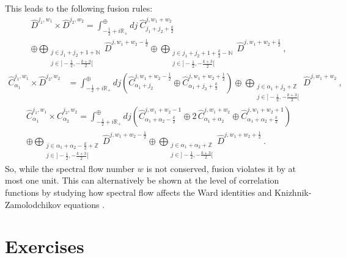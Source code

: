 \documentclass[12pt, a4paper, notitlepage, twoside]{report}
\numberwithin{equation}{section}
\theoremstyle{break}
\begin{document}
This leads to the following fusion rules:
\begin{multline}
\hat{D}^{j_1,w_1}\times \hat{D}^{j_2,w_2} = \int^\oplus_{-\frac12+i{\mathbb{R}}_+} dj\ \hat{C}^{j,w_1+w_2}_{j_1+j_2+\frac{k}{2}} 
\\ \oplus 
\bigoplus_{\substack{j\in j_1+j_2+1+{\mathbb{N}} \\ j\in ]-\frac12, -\frac{k+3}{2}[}} \hat{D}^{j,w_1+w_2-\frac12} \oplus 
\bigoplus_{\substack{j\in j_1+j_2+1+\frac{k}{2}-{\mathbb{N}} \\ j\in ]-\frac12, -\frac{k+3}{2}[}} \hat{D}^{j,w_1+w_2+\frac12}\ ,
\end{multline}
\begin{align}
 \hat{C}^{j_1,w_1}_{\alpha_1}\times \hat{D}^{j_2,w_2} &= \int^\oplus_{-\frac12+i{\mathbb{R}}_+} dj\left( \hat{C}^{j,w_1+w_2-\frac12}_{\alpha_1+j_2} \oplus \hat{C}^{j,w_1+w_2+\frac12}_{\alpha_1+j_2+\frac{k}{2}}\right) \oplus \bigoplus_{\substack{j\in \alpha_1+j_2+{\mathbb{Z}} \\ j\in ]-\frac12, -\frac{k+3}{2}[}} \hat{D}^{j,w_1+w_2}\ ,
\end{align}
\begin{multline}
 \hat{C}^{j_1,w_1}_{\alpha_1}\times \hat{C}^{j_2,w_2}_{\alpha_2} = \int^\oplus_{-\frac12+i{\mathbb{R}}_+} dj \left(\hat{C}^{j,w_1+w_2-1}_{\alpha_1+\alpha_2-\frac{k}{2}} \oplus 2\, \hat{C}^{j,w_1+w_2}_{\alpha_1+\alpha_2} \oplus \hat{C}^{j,w_1+w_2+1}_{\alpha_1+\alpha_2+\frac{k}{2}}\right) 
\\
\oplus \bigoplus_{\substack{j\in \alpha_1+\alpha_2-\frac{k}{2}+{\mathbb{Z}} \\ j\in]-\frac12, -\frac{k+3}{2}[}} \hat{D}^{j,w_1+w_2-\frac12} 
\oplus \bigoplus_{\substack{j\in \alpha_1+\alpha_2+{\mathbb{Z}} \\ j\in]-\frac12, -\frac{k+3}{2}[}} \hat{D}^{j,w_1+w_2+\frac12} \ .
\end{multline}
So, while the spectral flow number $w$ is not conserved, fusion violates it by at most one unit.
This can alternatively be shown at the level of correlation functions by studying how spectral flow affects the Ward identities and Knizhnik-Zamolodchikov equations \cite{rib05}.


\section{Exercises}
\end{document}
